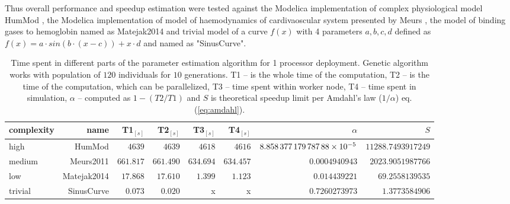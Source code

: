 Thus overall performance and speedup estimation were tested against the Modelica implementation of complex physiological model HumMod \cite{Kofranek2011hummod}, the Modelica implementation of model of haemodynamics of cardivaoscular system presented by Meurs \cite{Meurs2011}, the model of binding gases to hemoglobin named as Matejak2014 \cite{Matejak2014sj} and trivial model of a curve $f(x)$ with 4 parameters $a,b,c,d$ defined as $ f(x)=a\cdot sin(b\cdot (x-c))+x\cdot d$ and named as "SinusCurve".
\begin{table}[htb]
\footnotesize
\begin{tabular}{|l|r|r|r|r|r|r|r|}
\hline
complexity & name & T1$_{[s]}$ & T2$_{[s]}$ & T3$_{[s]}$ & T4$_{[s]}$ & $\alpha$ & $S$ \\
\hline
high & HumMod \cite{Kofranek2011hummod} & $\num{4639}$ & $\num{4639}$ & $\num{4618}$ & $\num{4616}$ & $\num{8.85837717978788E-005}$ & $\num{11288.7493917249}$ \\
medium & Meurs2011\cite{Meurs2011} & $\num{661.817}$ & $\num{661.490}$ & $\num{634.694}$ & $\num{634.457}$ & $\num{0.0004940943}$ & $\num{2023.9051987766}$ \\
low & Matejak2014\cite{Matejak2014sj} & $\num{17.868}$ & $\num{17.610}$ & $\num{1.399}$ & $\num{1.123}$ & $\num{0.014439221}$ & $\num{69.2558139535}$ \\
trivial & SinusCurve & $0.073$ & $0.020$ & x & x &  $\num{0.7260273973}$ & $\num{1.3773584906}$\\
\hline
\end{tabular}
\caption{Time spent in different parts of the parameter estimation algorithm for 1 processor deployment. Genetic algorithm works with population of $120$ individuals for $10$ generations. T1 -- is the whole time of the computation, T2 -- is the time of the computation, which can be parallelized, T3 -- time spent within worker node, T4 -- time spent in simulation, $\alpha$ -- computed as $1-(T2/T1)$ and $S$ is theoretical speedup limit per Amdahl's law ($1/\alpha$) eq.(\ref{eq:amdahl}).}
\label{table:speedupresult}
\end{table}

